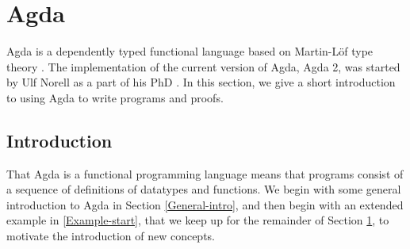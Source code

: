 \chapter{Agda}
\label{Agda}
Agda is a dependently typed functional language based on Martin-Löf type theory \citep{Martin-Lof}. The implementation of the current version of Agda, Agda 2, was started by Ulf Norell as a part of his PhD \citep{NorellAgda}.
In this section, we give a short introduction to using Agda to write programs and proofs.

\section{Introduction}
That Agda is a functional programming language means that programs consist of a sequence of definitions of datatypes and functions. We begin with some general introduction to Agda in Section \ref{General-intro}, and then begin with an extended example in \ref{Example-start}, that we keep up for the remainder of Section \ref{Agda}, to motivate the introduction of new concepts.
